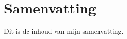 \resetpagenumbers
\cleardoublepage
{}

\chapter*{Samenvatting}%
%

Dit is de inhoud van mijn samenvatting.

